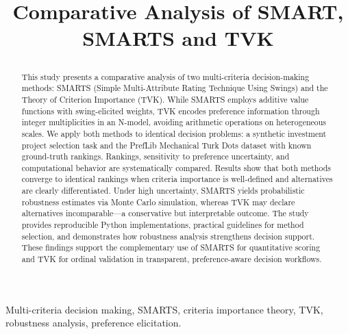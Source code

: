 \documentclass[conference]{IEEEtran}
\begin{document}
\title{Comparative Analysis of SMART, SMARTS and TVK

}

\author{

	}


\maketitle

\begin{abstract}
This study presents a comparative analysis of two multi-criteria decision-making methods: SMARTS (Simple Multi-Attribute Rating Technique Using Swings) and the Theory of Criterion Importance (TVK). While SMARTS employs additive value functions with swing-elicited weights, TVK encodes preference information through integer multiplicities in an N-model, avoiding arithmetic operations on heterogeneous scales. We apply both methods to identical decision problems: a synthetic investment project selection task and the PrefLib Mechanical Turk Dots dataset with known ground-truth rankings. Rankings, sensitivity to preference uncertainty, and computational behavior are systematically compared. Results show that both methods converge to identical rankings when criteria importance is well-defined and alternatives are clearly differentiated. Under high uncertainty, SMARTS yields probabilistic robustness estimates via Monte Carlo simulation, whereas TVK may declare alternatives incomparable—a conservative but interpretable outcome. The study provides reproducible Python implementations, practical guidelines for method selection, and demonstrates how robustness analysis strengthens decision support. These findings support the complementary use of SMARTS for quantitative scoring and TVK for ordinal validation in transparent, preference-aware decision workflows.
\end{abstract}

\begin{IEEEkeywords}
Multi-criteria decision making, SMARTS, criteria importance theory, TVK, robustness analysis, preference elicitation.
\end{IEEEkeywords}
\end{document}
